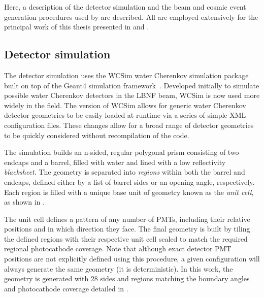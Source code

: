 Here, a description of the detector simulation and the beam and cosmic event generation procedures
used by \chips are described. All are employed extensively for the principal work of this thesis
presented in  and .

\subsection{Detector simulation} %
\label{sec:chips_monte_carlo_sim} %

The detector simulation uses the WCSim water Cherenkov simulation package~\cite{wcsim2020} built
on top of the Geant4 simulation framework~\cite{agostinelli2003, allison2006, allison2016}.
Developed initially to simulate possible water Cherenkov detectors in the LBNF beam, WCSim is now
used more widely in the field. The \chips version of WCSim allows for generic water Cherenkov
detector geometries to be easily loaded at runtime via a series of simple XML configuration files.
These changes allow for a broad range of detector geometries to be quickly considered without
recompilation of the code.

The simulation builds an n-sided, regular polygonal prism consisting of two endcaps and a barrel,
filled with water and lined with a low reflectivity \emph{blacksheet}. The geometry is separated
into \emph{regions} within both the barrel and endcaps, defined either by a list of barrel sides
or an opening angle, respectively. Each region is filled with a unique base unit of geometry known
as the \emph{unit cell}, as shown in .

The unit cell defines a pattern of any number of PMTs, including their relative positions and in
which direction they face. The final geometry is built by tiling the defined regions with their
respective unit cell scaled to match the required regional photocathode coverage. Note that
although exact detector PMT positions are not explicitly defined using this procedure, a given
configuration will always generate the same geometry (it is deterministic). In this work, the
\chipsfive geometry is generated with 28 sides and regions matching the boundary angles and
photocathode coverage detailed in .

